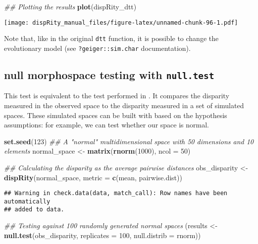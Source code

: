 \documentclass[
]{book}
\newenvironment{Shaded}{\begin{snugshade}}{\end{snugshade}}
\newcommand{\CommentTok}[1]{\textcolor[rgb]{0.56,0.35,0.01}{\textit{#1}}}
\newcommand{\DataTypeTok}[1]{\textcolor[rgb]{0.13,0.29,0.53}{#1}}
\newcommand{\DecValTok}[1]{\textcolor[rgb]{0.00,0.00,0.81}{#1}}
\newcommand{\KeywordTok}[1]{\textcolor[rgb]{0.13,0.29,0.53}{\textbf{#1}}}
\newcommand{\NormalTok}[1]{#1}
\newcommand{\StringTok}[1]{\textcolor[rgb]{0.31,0.60,0.02}{#1}}
\begin{document}
\begin{Shaded}
\begin{Highlighting}[]
\CommentTok{\#\# Plotting the results}
\KeywordTok{plot}\NormalTok{(dispRity\_dtt)}
\end{Highlighting}
\end{Shaded}

\texttt{[image: dispRity\_manual\_files/figure-latex/unnamed-chunk-96-1.pdf]}

Note that, like in the original \texttt{dtt} function, it is possible to change the evolutionary model (see \texttt{?geiger::sim.char} documentation).

\hypertarget{null-test}{%
\subsection{\texorpdfstring{null morphospace testing with \texttt{null.test}}{null morphospace testing with null.test}}\label{null-test}}

This test is equivalent to the test performed in \citet{diaz2016global}.
It compares the disparity measured in the observed space to the disparity measured in a set of simulated spaces.
These simulated spaces can be built with based on the hypothesis assumptions: for example, we can test whether our space is normal.

\begin{Shaded}
\begin{Highlighting}[]
\KeywordTok{set.seed}\NormalTok{(}\DecValTok{123}\NormalTok{)}
\CommentTok{\#\# A "normal" multidimensional space with 50 dimensions and 10 elements}
\NormalTok{normal\_space \textless{}{-}}\StringTok{ }\KeywordTok{matrix}\NormalTok{(}\KeywordTok{rnorm}\NormalTok{(}\DecValTok{1000}\NormalTok{), }\DataTypeTok{ncol =} \DecValTok{50}\NormalTok{)}

\CommentTok{\#\# Calculating the disparity as the average pairwise distances}
\NormalTok{obs\_disparity \textless{}{-}}\StringTok{ }\KeywordTok{dispRity}\NormalTok{(normal\_space,}
                          \DataTypeTok{metric =} \KeywordTok{c}\NormalTok{(mean, pairwise.dist))}
\end{Highlighting}
\end{Shaded}

\begin{verbatim}
## Warning in check.data(data, match_call): Row names have been automatically
## added to data.
\end{verbatim}

\begin{Shaded}
\begin{Highlighting}[]
\CommentTok{\#\# Testing against 100 randomly generated normal spaces}
\NormalTok{(results \textless{}{-}}\StringTok{ }\KeywordTok{null.test}\NormalTok{(obs\_disparity, }\DataTypeTok{replicates =} \DecValTok{100}\NormalTok{,}
                      \DataTypeTok{null.distrib =}\NormalTok{ rnorm))}
\end{Highlighting}
\end{Shaded}
\end{document}
